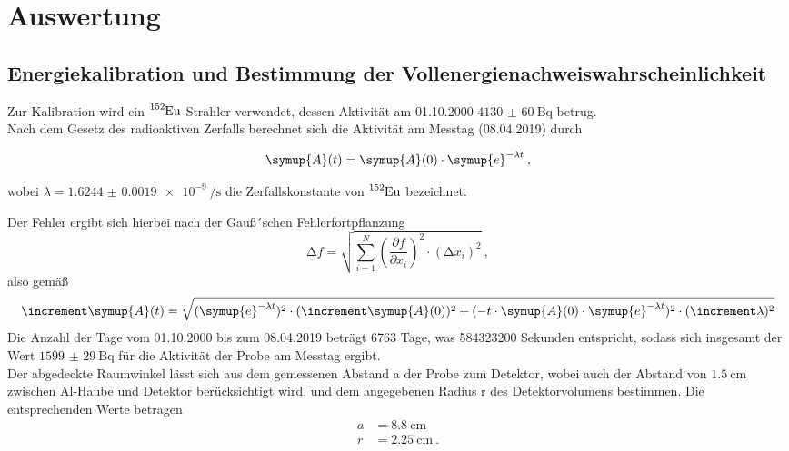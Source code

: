 \section{Auswertung}
\label{sec:Auswertung}

\subsection{Energiekalibration und Bestimmung der Vollenergienachweiswahrscheinlichkeit}
Zur Kalibration wird ein $\ce{^{152}Eu}$-Strahler verwendet, dessen Aktivität am 01.10.2000
$\SI{4130(60)}{\becquerel} $ betrug. \\
Nach dem Gesetz des radioaktiven Zerfalls berechnet sich die Aktivität am Messtag (08.04.2019) durch

\begin{equation}
  \symup{A} (t) = \symup{A}(0)\cdot \symup{e}^{-\lambda t} \: ,
\end{equation}

wobei $\lambda=\SI{1.6244(19)e-9}{\per\second}$ \cite{lara} die Zerfallskonstante
von $\ce{^{152}Eu}$ bezeichnet.

Der Fehler ergibt sich hierbei nach der Gauß´schen Fehlerfortpflanzung
\begin{equation}
  \increment f = \sqrt{ \sum_{i=1}^N \left( \frac{\partial f}{\partial x_i}\right)^2
  \cdot (\increment x_i)^2  } \: ,
  \label{eqn:gaus}
\end{equation}
also gemäß
\begin{equation}
  \increment \symup{A} (t) = \sqrt{ (\symup{e}^{-\lambda t})^{2}\cdot (\increment \symup{A}(0))^2
   + (-t\cdot\symup{A}(0)\cdot \symup{e}^{-\lambda t})^2\cdot(\increment \lambda)^2}
\end{equation}
Die Anzahl der Tage vom 01.10.2000 bis zum 08.04.2019 beträgt 6763 Tage, was
584323200 Sekunden entspricht, sodass sich insgesamt der Wert $\SI{1599(29)}{\becquerel} $
für die Aktivität der Probe am Messtag ergibt. \\
Der abgedeckte Raumwinkel lässt sich aus dem gemessenen Abstand a der Probe
zum Detektor, wobei auch der Abstand von $\SI{1.5}{\centi\meter}$ zwischen Al-Haube und Detektor
berücksichtigt wird,
und dem angegebenen Radius r des Detektorvolumens bestimmen. Die entsprechenden Werte
betragen
\begin{align*}
  a &= \SI{8.8}{\centi\meter} \\
  r &= \SI{2.25}{\centi\meter} \: .
\end{align*}

